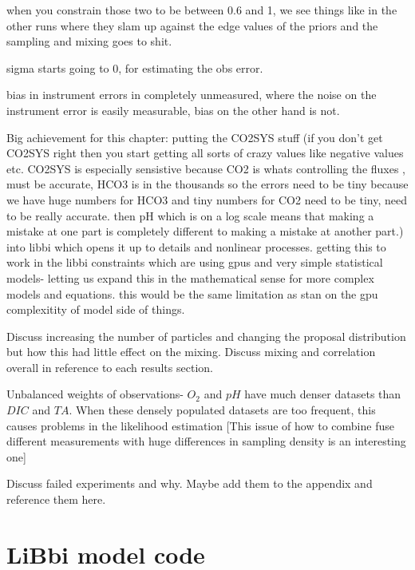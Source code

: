 \documentclass{ruthesis}
\begin{document}
when you constrain those two to be between 0.6 and 1, we see things like in the other runs where they slam up against the edge values of the priors and the sampling and mixing goes to shit.

sigma starts going to 0, for estimating the obs error.

bias in instrument errors in completely unmeasured, where the noise on the instrument error is easily measurable, bias on the other hand is not.

Big achievement for this chapter: putting the CO2SYS stuff (if you don't get CO2SYS right then you start getting all sorts of crazy values like negative values etc. CO2SYS is especially sensistive because CO2 is whats controlling the fluxes , must be accurate, HCO3 is in the thousands so the errors need to be tiny because we have huge numbers for HCO3 and tiny numbers for CO2 need to be tiny, need to be really accurate. then pH which is on a log scale means that making a mistake at one part is completely different to making a mistake at another part.) into libbi which opens it up to details and nonlinear processes. getting this to work in the libbi constraints which are using gpus and very simple statistical models- letting us expand this in the mathematical sense for more complex models and equations. this would be the same limitation as stan on the gpu complexitity of model side of things.


Discuss increasing the number of particles and changing the proposal distribution but how this had little effect on the mixing. Discuss mixing and correlation overall in reference to each results section.

Unbalanced weights of observations- $O_2$ and $pH$ have much denser datasets than $DIC$ and $TA$. When these densely populated datasets are too frequent, this causes problems in the likelihood estimation 
[This issue of how to combine  fuse different measurements with huge differences in sampling density is an interesting one]

Discuss failed experiments and why. Maybe add them to the appendix and reference them here.





\appendix

\chapter{LiBbi model code}\label{appendix_micro_libbi_code}
\end{document}
